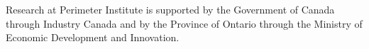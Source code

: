 \clearpage
\begin{acknowledgments}
Research at Perimeter Institute is supported by the Government of Canada through Industry Canada and by the Province of Ontario through the Ministry of Economic Development and Innovation.
\end{acknowledgments}

\setlength{\bibsep}{3pt plus 3pt minus 2pt}

\nocite{apsrev41Control}



\onecolumngrid
\appendix
\renewcommand{\theequation}{A-\arabic{equation}}
\setcounter{equation}{0}


\renewcommand{\labelenumi}{(\alph{enumi})}
\renewcommand{\theenumi}{(\alph{enumi})}
\renewcommand{\labelitemi}{$\circ$}


